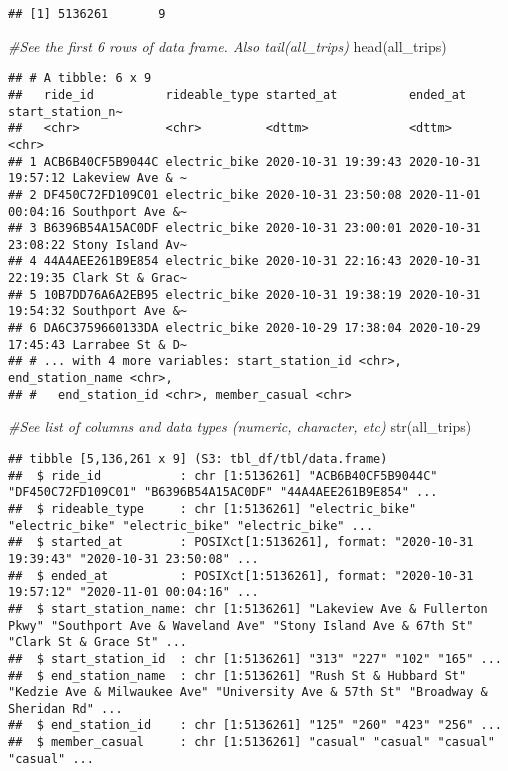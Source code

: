 \documentclass[
]{article}
\newenvironment{Shaded}{\begin{snugshade}}{\end{snugshade}}
\newcommand{\CommentTok}[1]{\textcolor[rgb]{0.56,0.35,0.01}{\textit{#1}}}
\newcommand{\FunctionTok}[1]{\textcolor[rgb]{0.00,0.00,0.00}{#1}}
\newcommand{\NormalTok}[1]{#1}
\begin{document}
\begin{verbatim}
## [1] 5136261       9
\end{verbatim}

\begin{Shaded}
\begin{Highlighting}[]
\CommentTok{\#See the first 6 rows of data frame.  Also tail(all\_trips)}
\FunctionTok{head}\NormalTok{(all\_trips)  }
\end{Highlighting}
\end{Shaded}

\begin{verbatim}
## # A tibble: 6 x 9
##   ride_id          rideable_type started_at          ended_at            start_station_n~
##   <chr>            <chr>         <dttm>              <dttm>              <chr>           
## 1 ACB6B40CF5B9044C electric_bike 2020-10-31 19:39:43 2020-10-31 19:57:12 Lakeview Ave & ~
## 2 DF450C72FD109C01 electric_bike 2020-10-31 23:50:08 2020-11-01 00:04:16 Southport Ave &~
## 3 B6396B54A15AC0DF electric_bike 2020-10-31 23:00:01 2020-10-31 23:08:22 Stony Island Av~
## 4 44A4AEE261B9E854 electric_bike 2020-10-31 22:16:43 2020-10-31 22:19:35 Clark St & Grac~
## 5 10B7DD76A6A2EB95 electric_bike 2020-10-31 19:38:19 2020-10-31 19:54:32 Southport Ave &~
## 6 DA6C3759660133DA electric_bike 2020-10-29 17:38:04 2020-10-29 17:45:43 Larrabee St & D~
## # ... with 4 more variables: start_station_id <chr>, end_station_name <chr>,
## #   end_station_id <chr>, member_casual <chr>
\end{verbatim}

\begin{Shaded}
\begin{Highlighting}[]
\CommentTok{\#See list of columns and data types (numeric, character, etc)}
\FunctionTok{str}\NormalTok{(all\_trips)  }
\end{Highlighting}
\end{Shaded}

\begin{verbatim}
## tibble [5,136,261 x 9] (S3: tbl_df/tbl/data.frame)
##  $ ride_id           : chr [1:5136261] "ACB6B40CF5B9044C" "DF450C72FD109C01" "B6396B54A15AC0DF" "44A4AEE261B9E854" ...
##  $ rideable_type     : chr [1:5136261] "electric_bike" "electric_bike" "electric_bike" "electric_bike" ...
##  $ started_at        : POSIXct[1:5136261], format: "2020-10-31 19:39:43" "2020-10-31 23:50:08" ...
##  $ ended_at          : POSIXct[1:5136261], format: "2020-10-31 19:57:12" "2020-11-01 00:04:16" ...
##  $ start_station_name: chr [1:5136261] "Lakeview Ave & Fullerton Pkwy" "Southport Ave & Waveland Ave" "Stony Island Ave & 67th St" "Clark St & Grace St" ...
##  $ start_station_id  : chr [1:5136261] "313" "227" "102" "165" ...
##  $ end_station_name  : chr [1:5136261] "Rush St & Hubbard St" "Kedzie Ave & Milwaukee Ave" "University Ave & 57th St" "Broadway & Sheridan Rd" ...
##  $ end_station_id    : chr [1:5136261] "125" "260" "423" "256" ...
##  $ member_casual     : chr [1:5136261] "casual" "casual" "casual" "casual" ...
\end{verbatim}
\end{document}
